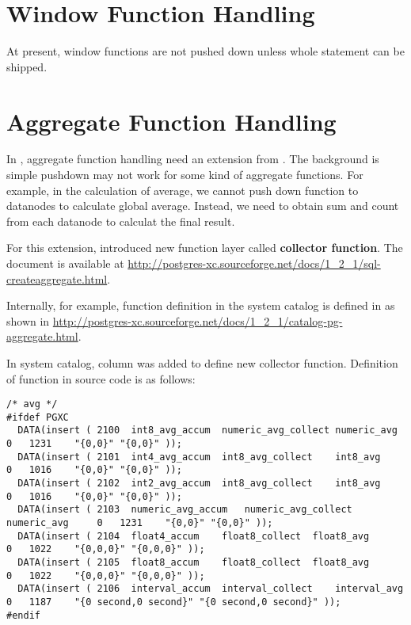 
\section{\label{sec:windowFunc}Window Function Handling}

  At present, window functions are not pushed down unless whole statement can be shipped.



\section{\label{sec:aggregateFunc}Aggregate Function Handling}

  In \XC, aggregate function handling need an extension from \PG.
  The background is simple pushdown may not work for some kind of aggregate functions.
  For example, in the calculation of average, we cannot push down  function to
  datanodes to calculate global average.
  Instead, we need to obtain sum and count from each datanode to calculat the final result.

  For this extension, \XC{} introduced new function layer called \textbf{collector function}.
  The document is available at
  \url{http://postgres-xc.sourceforge.net/docs/1_2_1/sql-createaggregate.html}.

  Internally, for example,  function definition in the system catalog is
  defined in  as shown in
  \url{http://postgres-xc.sourceforge.net/docs/1_2_1/catalog-pg-aggregate.html}.

  In  system catalog, column  was added to define
  new collector function.
  Definition of  function in  source code is as follows:

  \begin{lstlisting}[tabsize=4, frame=single]
/* avg */
#ifdef PGXC
  DATA(insert ( 2100  int8_avg_accum  numeric_avg_collect numeric_avg     0   1231    "{0,0}" "{0,0}" ));
  DATA(insert ( 2101  int4_avg_accum  int8_avg_collect    int8_avg        0   1016    "{0,0}" "{0,0}" ));
  DATA(insert ( 2102  int2_avg_accum  int8_avg_collect    int8_avg        0   1016    "{0,0}" "{0,0}" ));
  DATA(insert ( 2103  numeric_avg_accum   numeric_avg_collect numeric_avg     0   1231    "{0,0}" "{0,0}" ));
  DATA(insert ( 2104  float4_accum    float8_collect  float8_avg      0   1022    "{0,0,0}" "{0,0,0}" ));
  DATA(insert ( 2105  float8_accum    float8_collect  float8_avg      0   1022    "{0,0,0}" "{0,0,0}" ));
  DATA(insert ( 2106  interval_accum  interval_collect    interval_avg    0   1187    "{0 second,0 second}" "{0 second,0 second}" ));
#endif
  \end{lstlisting}

